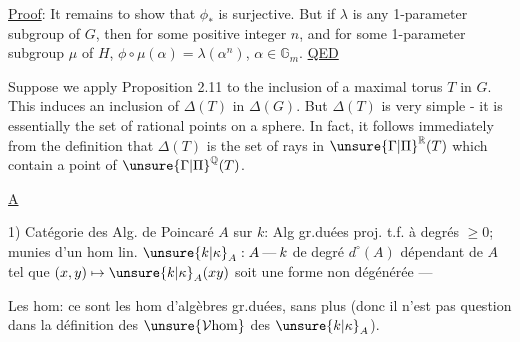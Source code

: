 \uline{Proof}: It remains to show that $\phi_*$ is surjective. But if $\lambda$ is any 1-parameter subgroup of $G$, then for some positive integer $n$, and for some 1-parameter subgroup $\mu$ of $H$, $\phi\circ\mu(\alpha)=\lambda(\alpha^n)$, $\alpha\in\mathbb G_m$. \uline{QED}

Suppose we apply Proposition 2.11 to the inclusion of a maximal torus $T$ in $G$. This induces an inclusion of $\Delta(T)$ in $\Delta(G)$. But $\Delta(T)$ is very simple - it is essentially the set of rational points on a sphere. In fact, it follows immediately from the definition that $\Delta(T)$ is the set of rays in $\unsure{\Gamma|\Pi}^{\mathbb R}(T)$ which contain a point of $\unsure{\Gamma|\Pi}^{\mathbb Q}(T)$.

\uline{A}

1) Catégorie  des Alg. de Poincaré $A$ sur $k$: Alg gr.duées proj.  t.f. à degrés $\geq0$; munies d'un hom lin. $\unsure{k|\kappa}_A:A\mathbin{\text{---}}k$ de degré $d^\circ(A)$ dépendant de $A$ tel que $(x,y)\mapsto\unsure{k|\kappa}_A(xy)$ soit une forme  non dégénérée ---

Les hom: ce sont les hom d'algèbres gr.duées, sans plus (donc il n'est pas question dans la définition des $\unsure{\mathcal V\mathrm{hom}}$ des $\unsure{k|\kappa}_A$).

